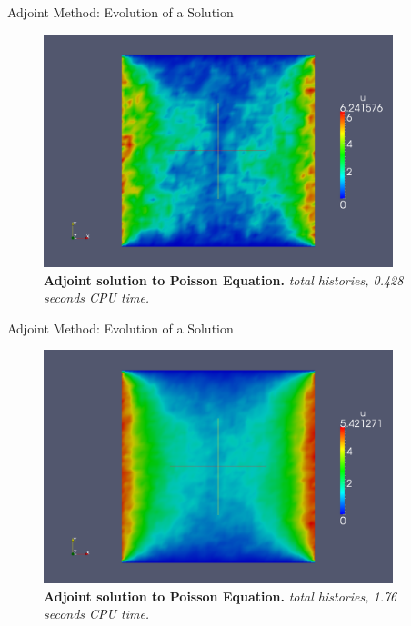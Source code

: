 \documentclass{beamer}
\begin{document}
\begin{frame}{Adjoint Method: Evolution of a Solution}

  \begin{figure}[h!]
    \begin{center}
      \includegraphics[width=4in]{../../prelim/presentation/adjoint_10000.png}
    \end{center}
    \caption{\textbf{Adjoint solution to Poisson Equation.}
      \textit{ total histories, 0.428 seconds CPU time.} }
  \end{figure}

\end{frame}

\begin{frame}{Adjoint Method: Evolution of a Solution}

  \begin{figure}[h!]
    \begin{center}
      \includegraphics[width=4in]{../../prelim/presentation/adjoint_100000.png}
    \end{center}
    \caption{\textbf{Adjoint solution to Poisson Equation.}
      \textit{ total histories, 1.76 seconds CPU time.} }
  \end{figure}

\end{frame}
\end{document}
